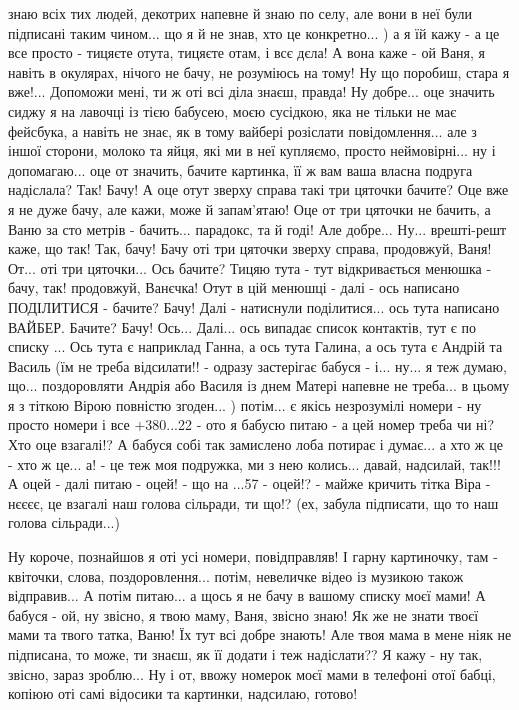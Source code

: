 знаю всіх тих людей, декотрих напевне й знаю по селу, але вони в неї були
підписані таким чином... що я й не знав, хто це конкретно... ) а я їй кажу - а
це все просто - тицяєте отута, тицяєте отам, і всє дєла! А вона каже - ой Ваня,
я навіть в окулярах, нічого не бачу, не розуміюсь на тому! Ну що поробиш, стара
я вже!...  Допоможи мені, ти ж оті всі діла знаєш, правда!  Ну добре... оце
значить сиджу я на лавочці із тією бабусею, моєю сусідкою, яка не тільки не має
фейсбука, а навіть не знає, як в тому вайбері розіслати повідомлення... але з
іншої сторони, молоко та яйця, які ми в неї купляємо, просто неймовірні...  ну
і допомагаю... оце от значить, бачите картинка, її ж вам ваша власна подруга
надіслала?  Так! Бачу! А оце отут зверху справа такі три цяточки бачите?  Оце
вже я не дуже бачу, але кажи, може й запам'ятаю! Оце от три цяточки не бачить,
а Ваню за сто метрів - бачить...  парадокс, та й годі!  Але добре... Ну...
врешті-решт каже, що так! Так, бачу!  Бачу оті три цяточки зверху справа,
продовжуй, Ваня!  От... оті три цяточки... Ось бачите? Тицяю тута - тут
відкривається менюшка - бачу, так!  продовжуй, Ванєчка! Отут в цій менюшці -
далі - ось написано ПОДІЛИТИСЯ - бачите? Бачу!  Далі - натиснули поділитися...
ось тута написано ВАЙБЕР. Бачите? Бачу! Ось...  Далі... ось випадає список
контактів, тут є по списку ... Ось тута є наприклад Ганна, а ось тута Галина, а
ось тута є Андрій та Василь (їм не треба відсилати!! - одразу застерігає бабуся
- і... ну... я теж думаю, що... поздоровляти Андрія або Василя із днем Матері
напевне не треба... в цьому я з тіткою Вірою повністю згоден... ) потім... є
якісь незрозумілі номери - ну просто номери і все +380...22 - ото я бабусю
питаю - а цей номер треба чи ні? Хто оце взагалі!? А бабуся собі так замислено
лоба потирає і думає... а хто ж це - хто ж це... а! - це теж моя подружка, ми з
нею колись...  давай, надсилай, так!!!  А оцей - далі питаю - оцей! - що на
...57 - оцей!? - майже кричить тітка Віра - нєєєє, це взагалі наш голова
сільради, ти що!?  (ех, забула підписати, що то наш голова сільради...)

Ну короче, познайшов я оті усі номери, повідправляв! І гарну картиночку, там -
квіточки, слова, поздоровлення...  потім, невеличке відео із музикою також
відправив... А потім питаю... а щось я не бачу в вашому списку моєї мами!  А
бабуся - ой, ну звісно, я твою маму, Ваня, звісно знаю! Як же не знати твоєї
мами та твого татка, Ваню! Їх тут всі добре знають!  Але твоя мама в мене ніяк
не підписана, то може, ти знаєш, як її додати і теж надіслати?? Я кажу - ну
так, звісно, зараз зроблю... Ну і от, ввожу номерок моєї мами в телефоні отої
бабці, копіюю оті самі відосики та картинки, надсилаю, готово! 

